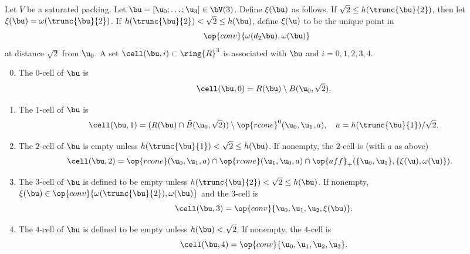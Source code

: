 \begin{definition} 
  Let $V$ be a saturated packing.  Let $\bu=[\u_0;\ldots;\u_3]\in
  \bV(3)$.  Define $\xi(\bu)$ as follows.  If $\sqrt2\le
  h(\trunc{\bu}{2})$, then let $\xi(\bu)=\omega(\trunc{\bu}{2})$.  If
  $h(\trunc{\bu}{2})<\sqrt2\le h(\bu)$, define $\xi(\u)$
  to be the unique point in
\[
\op{conv}\{\omega(d_2\bu),\omega(\bu)\}
\]
at distance $\sqrt2$ from $\u_0$.  
A set $\cell(\bu,i)\subset\ring{R}^3$ is associated with $\bu$ and $i=0,1,2,3,4$.  
\hfill\break\smallskip 
\begin{enumerate}
\setcounter{enumi}{-1}
\item %
The $0$-cell of $\bu$
is
\[  
\cell(\bu,0) = R(\bu)\setminus B(\u_0,\sqrt2).%
\] 
\bigskip
\item
The $1$-cell of $\bu$ is 
\[  
\cell(\bu,1) = (R(\bu) \cap  \bar B(\u_0,\sqrt2))\setminus \op{rcone}^0(\u_0,\u_1,a),
\quad a={h(\trunc{\bu}{1})}/{\sqrt2}.
\] 
\bigskip
\item
The $2$-cell of $\bu$ is
empty unless $h(\trunc{\bu}{1})<\sqrt2\le h(\bu)$.  If nonempty, the $2$-cell is
(with $a$ as above)
\begin{align*} 
\cell(\bu,2) &= 
 \op{rcone}(\u_0,\u_1,a)\cap \op{rcone}(\u_1,\u_0,a)\cap 
\op{aff}_+(\{\u_0,\u_1\},\{\xi(\u),\omega(\u)\}).
\end{align*}
\bigskip
\item
The $3$-cell of $\bu$ is defined to be empty unless 
$h(\trunc{\bu}{2}) <\sqrt2 \le h(\bu)$.
If nonempty, $\xi(\bu)\in \op{conv}\{\omega(\trunc{\bu}{2}),\omega(\bu)\}$
and  the $3$-cell is
\[  
\cell(\bu,3) = \op{conv}\{ \u_0, \u_1, \u_2,\xi(\bu)\}.
\] 
\bigskip
\item
The $4$-cell of $\bu$ is defined to be empty unless
$h(\bu) <\sqrt2$.
If nonempty, the $4$-cell is
\[  
\cell(\bu,4) = \op{conv}\{ \u_0, \u_1, \u_2, \u_3\}.
\] 
\end{enumerate}
\end{definition}
%

